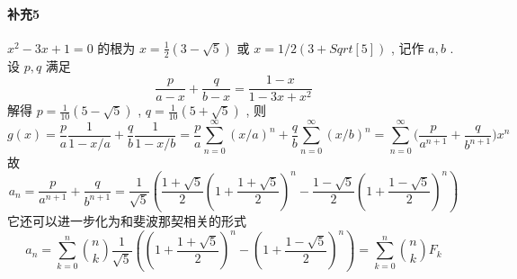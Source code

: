 \documentclass[a4paper, UTF8]{ctexart}				%
\numberwithin{equation}{section}				%
\begin{document}
    \paragraph{补充5}\quad 
        $x^2 - 3x + 1 = 0$ 的根为 $x = \frac{1}{2} (3-\sqrt{5})$ 或 $x = 1/2 (3 + Sqrt[5])$ , 记作 $a,b$ . 设 $p,q$ 满足 
        \[
            \frac{p}{a-x} + \frac{q}{b-x} = \frac{1-x}{1-3x+x^2}
        \]
        解得 $p = \frac{1}{10} (5-\sqrt{5})$ , $q = \frac{1}{10} (5+\sqrt{5})$ , 则 
        \[
            g(x) = \frac{p}{a} \frac{1}{1-x/a} + \frac{q}{b} \frac{1}{1-x/b} = \frac{p}{a} \sum^{\infty}_{n=0} (x/a)^n + \frac{q}{b} \sum^{\infty}_{n=0} (x/b)^n = \sum^{\infty}_{n=0} \Big(\frac{p}{a^{n+1}} + \frac{q}{b^{n+1}}\Big)x^n
        \]
        故 
        \[
            a_n = \frac{p}{a^{n+1}} + \frac{q}{b^{n+1}} = \frac{1}{\sqrt{5}}\left(\frac{1 + \sqrt{5}}{2}  \left(1+\frac{1+\sqrt{5}}{2}\right)^n-\frac{1-\sqrt{5}}{2} \left(1+\frac{1-\sqrt{5}}{2} \right)^n\right)
        \]
        它还可以进一步化为和斐波那契相关的形式 
        \[
            a_n = \sum^{n}_{k=0} {{n} \choose {k}} \frac{1}{\sqrt{5}}\left(\left(1+\frac{1+\sqrt{5}}{2}\right)^n - \left(1+\frac{1-\sqrt{5}}{2} \right)^n\right) = \sum^{n}_{k=0} {{n} \choose {k}} F_k
        \]
\end{document}
